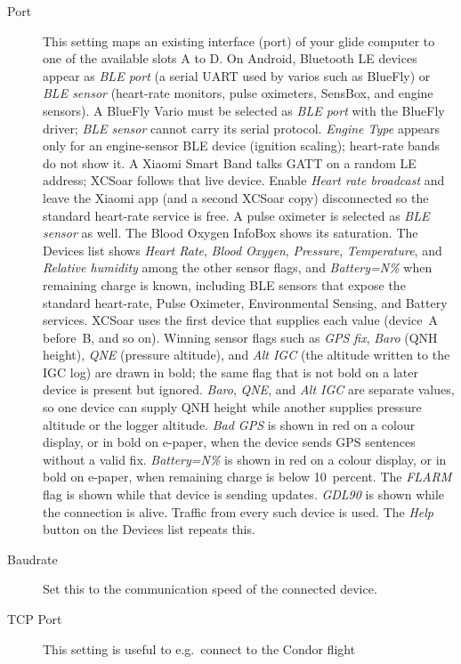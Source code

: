 \begin{description}
\item[Port]  This setting maps an existing interface (port) of your 
  glide computer to one of the available slots A to D.
  On Android, Bluetooth LE devices appear as {\it BLE port} (a
  serial UART used by varios such as BlueFly) or {\it BLE sensor}
  (heart-rate monitors, pulse oximeters, SensBox, and engine sensors).
  A BlueFly Vario must be selected as {\it BLE port} with the BlueFly
  driver; {\it BLE sensor} cannot carry its serial protocol.
  {\it Engine Type} appears only for an engine-sensor BLE device
  (ignition scaling); heart-rate bands do not show it.
  A Xiaomi Smart Band talks GATT on a random LE address; XCSoar
  follows that live device.  Enable {\it Heart rate broadcast} and
  leave the Xiaomi app (and a second XCSoar copy) disconnected so the
  standard heart-rate service is free.
  A pulse oximeter is selected as {\it BLE sensor} as well.  The
  Blood Oxygen InfoBox shows its saturation.
  The Devices list shows {\it Heart Rate}, {\it Blood Oxygen},
  {\it Pressure}, {\it Temperature}, and {\it Relative humidity}
  among the other sensor flags, and {\it Battery=N\%} when remaining
  charge is known, including BLE sensors that expose the standard
  heart-rate, Pulse Oximeter, Environmental Sensing, and Battery
  services.
  XCSoar uses the first device that supplies each value (device~A
  before~B, and so on).  Winning sensor flags such as {\it GPS fix},
  {\it Baro} (QNH height), {\it QNE} (pressure altitude), and
  {\it Alt IGC} (the altitude written to the IGC log) are
  drawn in bold; the same flag that is not bold on a later device is
  present but ignored.  {\it Baro}, {\it QNE}, and {\it Alt IGC} are
  separate values, so one device can supply QNH height while another
  supplies pressure altitude or the logger altitude.
  {\it Bad GPS} is shown in red on a colour display, or in bold on
  e-paper, when the device sends GPS sentences without a valid fix.
  {\it Battery=N\%} is shown in red on a colour display, or in bold
  on e-paper, when remaining charge is below 10~percent.
  The {\it FLARM} flag is shown while that device is sending
  updates.
  {\it GDL90} is shown while the connection is alive.
  Traffic from every such device is used.
  The {\it Help} button on the Devices list repeats this.
\item[Baudrate]  Set this to the communication speed of the connected device.
\item[TCP Port]  This setting is useful to e.g.\ connect to the Condor flight

\end{description}
